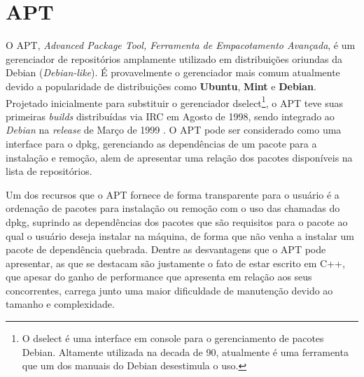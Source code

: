 \section{APT} %
\label{sec:apt}


O {\code APT}, \textit{Advanced Package Tool, Ferramenta de Empacotamento Avançada}, é um gerenciador de repositórios  amplamente utilizado em distribuições oriundas da Debian (\textit{Debian-like}).
É provavelmente o gerenciador mais comum atualmente devido a popularidade de distribuições como \textbf{Ubuntu}, \textbf{Mint} e \textbf{Debian}.
Projetado inicialmente para substituir o gerenciador {\code dselect}\footnote{O {\code dselect} é uma interface em console para o gerenciamento de pacotes Debian. Altamente utilizada na decada de 90, atualmente é uma ferramenta que um dos manuais do Debian \cite{dselect} desestimula o uso.}, o APT teve suas primeiras \textit{builds} distribuídas via IRC em Agosto de 1998,  sendo integrado ao \textit{Debian} na \textit{release} de Março de 1999 \cite{garbee2008brief}. O  APT pode ser considerado como uma interface para o {\code dpkg}, gerenciando as dependências de um pacote para a instalação e remoção, alem de apresentar uma relação dos pacotes disponíveis na lista de repositórios. 

Um dos recursos que o APT fornece de forma transparente para o usuário é a ordenação de pacotes para instalação ou remoção com o uso das chamadas do {\code dpkg}, suprindo as dependências dos pacotes que são requisitos para o pacote ao qual o usuário deseja instalar na máquina, de forma que não venha a instalar um pacote de dependência quebrada. Dentre as desvantagens que o APT pode apresentar, as que se destacam são justamente o fato de estar escrito em C++, que apesar do ganho de performance que apresenta em relação aos seus concorrentes, carrega junto uma maior dificuldade de manutenção devido ao tamanho e complexidade. 

